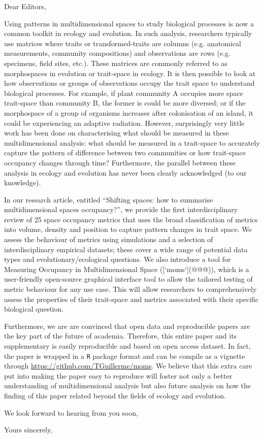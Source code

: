\documentclass[11pt]{letter}
\begin{document}
\begin{letter}{}
\opening{Dear Editors,}

Using patterns in multidimensional spaces to study biological processes is now a common toolkit in ecology and evolution.
In such analysis, researchers typically use matrices where traits or transformed-traits are columns (e.g. anatomical measurements, community compositions) and observations are rows (e.g. specimens, field sites, etc.).
These matrices are commonly referred to as morphospaces in evolution or trait-space in ecology.
It is then possible to look at how observations or groups of observations occupy the trait space to understand biological processes.
For example, if plant community A occupies more space trait-space than community B, the former is could be more diversed;
or if the morphospace of a group of organisms increases after colonisation of an island, it could be experiencing an adaptive radiation.
However, surprisingly very little work has been done on characterising what should be measured in these multidimensional analysis: what should be measured in a trait-space to accurately capture the pattern of difference between two communities or how trait-space occupancy changes through time?
Furthermore, the parallel between these analysis in ecology and evolution has never been clearly acknowledged (to our knowledge).

In our research article, entitled ``Shifting spaces: how to summarise multidimensional spaces occupancy?'', we provide the first interdisciplinary review of 25 space occupancy metrics that uses the broad classification of metrics into volume, density and position to capture pattern changes in trait space.
We assess the behaviour of metrics using simulations and a selection of interdisciplinary empirical datasets; these cover a wide range of potential data types and evolutionary/ecological questions.
We also introduce a tool for Measuring Occupancy in Multidimensional Space ([`moms`](@@@)), which is a user-friendly open-source graphical interface tool to allow the tailored testing of metric behaviour for any use case.
This will allow researchers to comprehensively assess the properties of their trait-space and metrics associated with their specific biological question.

Furthermore, we are are convinced that open data and reproducible papers are the key part of the future of academia.
Therefore, this entire paper and its supplementary is easily reproducible and based on open access dataset.
In fact, the paper is wrapped in a \texttt{R} package format and can be compile as a vignette through \url{https://github.com/TGuillerme/moms}.
We believe that this extra care put into making the paper easy to reproduce will foster not only a better understanding of multidimensional analysis but also future analysis on how the finding of this paper related beyond the fields of ecology and evolution.

We look forward to hearing from you soon,

\closing{Yours sincerely,}


\end{letter}
\end{document}
